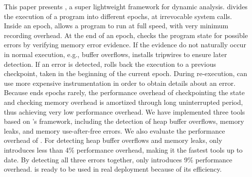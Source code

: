 
This paper presents \doubletake{}, a super lightweight framework for dynamic analysis. \doubletake{} divides the execution of a program into different epochs, at irrevocable system calls. Inside an epoch, \doubletake{} allows a program to run at full speed, with very minimum recording overhead. 
At the end of an epoch, \doubletake{} checks the program state for possible errors by verifying memory error evidence. If the evidence do not naturally occur in normal execution, e.g., buffer overflows, \doubletake{} installs tripwires to ensure later detection. If an error is detected, \doubletake{} rolls back the execution to a previous checkpoint, taken in the beginning of the current epoch. During re-execution, \doubletake{} can use more expensive instrumentation in order to obtain details about an error. Because \doubletake{} ends epochs rarely, the performance overhead of checkpointing the state and checking memory overhead is amortized through long uninterrupted period, thus achieving very low performance overhead. We have implemented three tools based on \doubletake{}'s framework, including the detection of heap buffer overflows, memory leaks, and memory use-after-free errors. We also evaluate the performance overhead of \doubletake{}. For detecting heap buffer overflows and memory leaks, \doubletake{} only introduces less than 4\% performance overhead, making it the fastest tools up to date. By detecting all three errors together, \doubletake{} only introduces 9\% performance overhead. \doubletake{} is ready to be used in real deployment because of its efficiency. 

